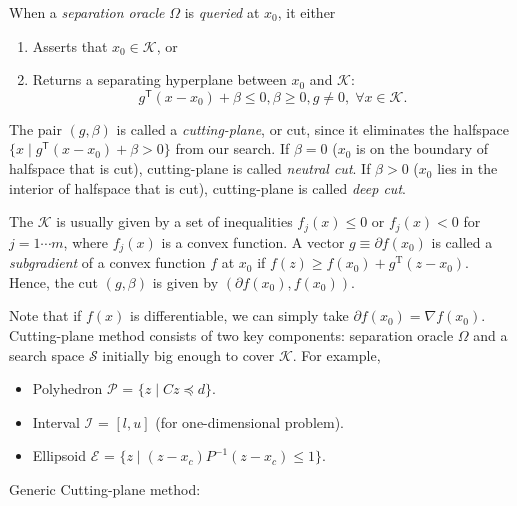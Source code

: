 \documentclass[final,leqno]{siamltex}
\providecommand{\tightlist}{%
  \setlength{\itemsep}{0pt}\setlength{\parskip}{0pt}}
\begin{document}
When a \emph{separation oracle} \(\Omega\) is \emph{queried} at \(x_0\), it either

\begin{enumerate}
\def\labelenumi{\arabic{enumi}.}
\tightlist
\item
  Asserts that \(x_0 \in \mathcal{K}\), or
\item
  Returns a separating hyperplane between \(x_0\) and \(\mathcal{K}\):
  \begin{equation}g^\mathsf{T} (x - x_0) + \beta \leq 0, \beta \geq 0, g \neq 0, \; \forall x \in \mathcal{K}.\label{eq:cut}\end{equation}
\end{enumerate}

The pair \((g, \beta)\) is called a \emph{cutting-plane}, or cut, since it eliminates the halfspace \(\{x \mid g^\mathsf{T} (x - x_0) + \beta > 0\}\) from our search. If \(\beta=0\) (\(x_0\) is on the boundary of halfspace that is cut), cutting-plane is called \emph{neutral cut}. If \(\beta>0\) (\(x_0\) lies in the interior of halfspace that is cut), cutting-plane is called \emph{deep cut}.

The \(\mathcal{K}\) is usually given by a set of inequalities \(f_j(x) \le 0\) or \(f_j(x) < 0\) for \(j = 1 \cdots m\), where \(f_j(x)\) is a convex function. A vector \(g \equiv \partial f(x_0)\) is called a \emph{subgradient} of a convex function \(f\) at \(x_0\) if \(f(z) \geq f(x_0) + g^\mathrm{T} (z - x_0)\). Hence, the cut \((g, \beta)\) is given by \((\partial f(x_0), f(x_0))\).

Note that if \(f(x)\) is differentiable, we can simply take \(\partial f(x_0) = \nabla f(x_0)\). Cutting-plane method consists of two key components: separation oracle \(\Omega\) and a search space \(\mathcal{S}\) initially big enough to cover \(\mathcal{K}\). For example,

\begin{itemize}
\tightlist
\item
  Polyhedron \(\mathcal{P}\) = \(\{z \mid C z \preceq d \}\).
\item
  Interval \(\mathcal{I}\) = \([l, u]\) (for one-dimensional problem).
\item
  Ellipsoid \(\mathcal{E}\) = \(\{z \mid (z-x_c)P^{-1}(z-x_c) \leq 1 \}\).
\end{itemize}

Generic Cutting-plane method:
\end{document}
